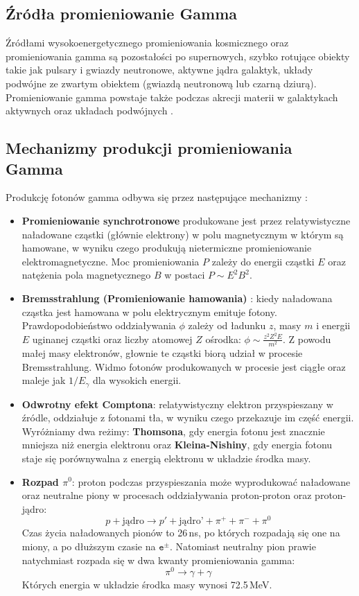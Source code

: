 \documentclass[a4paper,11pt,twoside]{article}
\begin{document}
\subsection{Źródła promieniowanie Gamma}
Źródłami wysokoenergetycznego promieniowania kosmicznego oraz promieniowania gamma są pozostałości po supernowych, szybko rotujące obiekty takie jak pulsary i gwiazdy neutronowe, aktywne jądra galaktyk, układy podwójne ze zwartym obiektem (gwiazdą neutronową lub czarną dziurą). Promieniowanie gamma powstaje także podczas akrecji materii w galaktykach aktywnych oraz układach podwójnych \cite{astro_particle}. 
\subsection{Mechanizmy produkcji promieniowania Gamma}
Produkcję fotonów gamma odbywa się przez następujące mechanizmy \cite{astro_particle}:
\begin{itemize}
\item {\bf{Promieniowanie synchrotronowe}}
produkowane jest przez relatywistyczne naładowane cząstki (głównie elektrony) w polu magnetycznym w którym są hamowane, w wyniku czego produkują nietermiczne promieniowanie elektromagnetyczne. Moc promieniowania $P$ zależy do energii cząstki $E$ oraz natężenia pola magnetycznego $B$ w postaci $P \sim E^2 B^2$.
\item {\bf{Bremsstrahlung} (Promieniowanie hamowania) }:
kiedy naładowana cząstka jest hamowana w polu elektrycznym emituje fotony. Prawdopodobieństwo oddziaływania $\phi$ zależy od ładunku $z$, masy $m$ i energii $E$ uginanej cząstki oraz liczby atomowej $Z$ ośrodka: $\phi \sim \frac{z^2 Z^2 E}{m^2}$. Z powodu małej masy elektronów, głownie te cząstki biorą udział w procesie Bremsstrahlung. Widmo fotonów produkowanych w procesie jest ciągłe oraz maleje jak $1/E_{\gamma}$ dla wysokich energii.  
\item {\bf{Odwrotny efekt Comptona}}:
relatywistyczny elektron przyspieszany w źródle, oddziałuje z fotonami tła, w wyniku czego przekazuje im część energii. Wyróżniamy dwa reżimy: {\bf{Thomsona}}, gdy energia fotonu jest znacznie mniejsza niż energia elektronu oraz {\bf{Kleina-Nishiny}}, gdy energia fotonu staje się porównywalna z energią elektronu w układzie środka masy. 
\item {\bf{Rozpad $\pi^0$}}: proton podczas przyspieszania może wyprodukować naładowane oraz neutralne piony w procesach oddziaływania proton-proton oraz proton-jądro:
\begin{equation}
p + \text{jądro} \rightarrow p' + \text{jądro'} + \pi^+ + \pi^- + \pi^0
\end{equation} 
Czas życia naładowanych pionów to 26\,ns, po których rozpadają się one na miony, a po dłuższym czasie na $\mathtt{e^{\pm}}$. Natomiast neutralny pion prawie natychmiast rozpada się w dwa kwanty promieniowania gamma:
\begin{equation}
\pi^0 \rightarrow \gamma + \gamma
\end{equation}
Których energia w układzie środka masy wynosi 72.5\,MeV.
\end{itemize}
\end{document}
